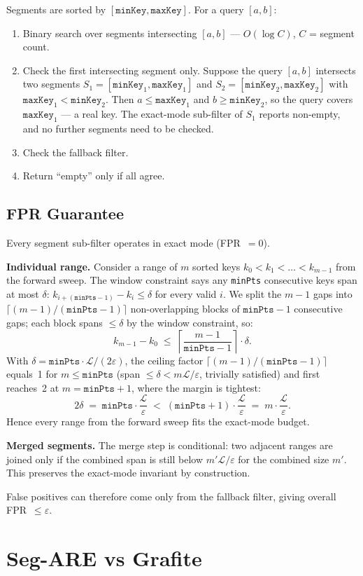 Segments are sorted by $[\texttt{minKey}, \texttt{maxKey}]$. For a query $[a, b]$:
\begin{enumerate}
    \item Binary search over segments intersecting $[a, b]$ --- $O(\log C)$, $C$ = segment
    count.
    \item Check the first intersecting segment only.
    Suppose the query $[a, b]$
    intersects two segments $S_1 = [\texttt{minKey}_1, \texttt{maxKey}_1]$ and
    $S_2 = [\texttt{minKey}_2, \texttt{maxKey}_2]$ with $\texttt{maxKey}_1 < \texttt{minKey}_2$.
    Then $a \leq \texttt{maxKey}_1$ and $b \geq \texttt{minKey}_2$, so the query covers
    $\texttt{maxKey}_1$ --- a real key.
    The exact-mode sub-filter of $S_1$ reports
    non-empty, and no further segments need to be checked.
    \item Check the fallback filter.
    \item Return ``empty'' only if all agree.
\end{enumerate}

\subsection{FPR Guarantee}\label{subsec:fpr-guarantee}

Every segment sub-filter operates in exact mode (FPR~$= 0$).

\textbf{Individual range.} Consider a range of $m$ sorted keys
$k_0 < k_1 < \dots < k_{m-1}$ from the forward sweep.
The window constraint says any \texttt{minPts} consecutive keys span at most
$\delta$: $k_{i+(\texttt{minPts}-1)} - k_i \leq \delta$ for every valid $i$.
We split the $m-1$ gaps into $\lceil(m-1)/(\texttt{minPts}-1)\rceil$
non-overlapping blocks of $\texttt{minPts}-1$ consecutive gaps; each block
spans $\leq \delta$ by the window constraint, so:
\[
    k_{m-1} - k_0 \;\leq\; \left\lceil \frac{m-1}{\texttt{minPts}-1} \right\rceil \cdot \delta.
\]
With $\delta = \texttt{minPts}\cdot\mathcal{L}/(2\varepsilon)$, the ceiling factor
$\lceil(m-1)/(\texttt{minPts}-1)\rceil$ equals~1 for $m \leq \texttt{minPts}$
(span $\leq \delta < m\mathcal{L}/\varepsilon$, trivially satisfied) and first
reaches~2 at $m = \texttt{minPts}+1$, where the margin is tightest:
\[
    2\delta \;=\; \texttt{minPts} \cdot \frac{\mathcal{L}}{\varepsilon}
    \;<\; (\texttt{minPts}+1) \cdot \frac{\mathcal{L}}{\varepsilon}
    \;=\; m \cdot \frac{\mathcal{L}}{\varepsilon}.
\]
Hence every range from the forward sweep fits the exact-mode budget.

\textbf{Merged segments.} The merge step is conditional: two adjacent ranges are
joined only if the combined span is still below $m'\mathcal{L}/\varepsilon$ for the
combined size $m'$. This preserves the exact-mode invariant by construction.

False positives can therefore come only from the fallback filter, giving overall
FPR~$\leq \varepsilon$.

\section{Seg-ARE vs Grafite}
\label{sec:hybrid-ef}


